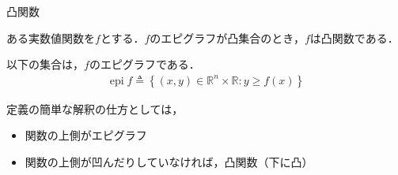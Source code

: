 \documentclass[aspectratio=169, dvipdfmx, 10.5pt]{beamer} %
\DeclareMathOperator{\epi}{epi}
\begin{document}
\begin{frame}{凸関数}
    \begin{definition}[凸関数]
        ある実数値関数を$f$とする．$f$のエピグラフが凸集合のとき，$f$は\alert{凸関数}である．
    \end{definition}
    \begin{definition}[エピグラフ]
        以下の集合は，$f$の\alert{エピグラフ}である．
        \begin{align*}
            \epi f \triangleq \left\{(x, y) \in \mathbb{R}^n \times \mathbb{R} : y \geq f(x)\right\}
        \end{align*}
    \end{definition}

    定義の簡単な解釈の仕方としては，
    \begin{itemize}
        \item 関数の上側がエピグラフ
        \item 関数の上側が凹んだりしていなければ，凸関数（下に凸）
    \end{itemize}
\end{frame}
\end{document}
